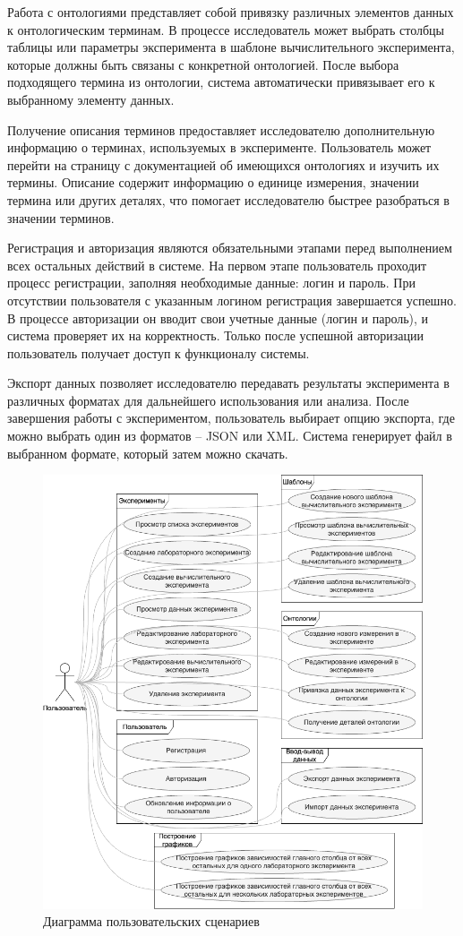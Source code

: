 Работа с онтологиями представляет собой привязку различных элементов данных к онтологическим терминам.
В процессе исследователь может выбрать столбцы таблицы или параметры эксперимента в шаблоне вычислительного эксперимента, которые должны быть связаны с конкретной онтологией.
После выбора подходящего термина из онтологии, система автоматически привязывает его к выбранному элементу данных.

Получение описания терминов предоставляет исследователю дополнительную информацию о терминах, используемых в эксперименте.
Пользователь может перейти на страницу с документацией об имеющихся онтологиях и изучить их термины.
Описание содержит информацию о единице измерения, значении термина или других деталях, что помогает исследователю быстрее разобраться в значении терминов.

Регистрация и авторизация являются обязательными этапами перед выполнением всех остальных действий в системе.
На первом этапе пользователь проходит процесс регистрации, заполняя необходимые данные: логин и пароль.
При отсутствии пользователя с указанным логином регистрация завершается успешно.
В процессе авторизации он вводит свои учетные данные (логин и пароль), и система проверяет их на корректность.
Только после успешной авторизации пользователь получает доступ к функционалу системы.

Экспорт данных позволяет исследователю передавать результаты эксперимента в различных форматах для дальнейшего использования или анализа.
После завершения работы с экспериментом, пользователь выбирает опцию экспорта, где можно выбрать один из форматов -- JSON или XML.
Система генерирует файл в выбранном формате, который затем можно скачать.

\begin{figure}[H]
    \centering
    \includegraphics[width=0.35\linewidth]{img/use_cases.png}
    \caption{Диаграмма пользовательских сценариев}
    \label{pic:uc}
\end{figure}

